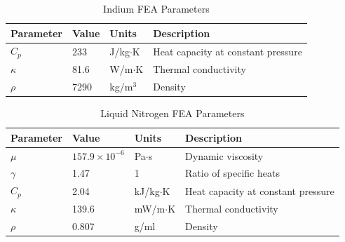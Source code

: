 \documentclass[preprint]{iucr}              %
\begin{document}
\begin{table}
\caption{Indium FEA Parameters}
\begin{tabular}{@{}llll@{}}
Parameter    & Value                  & Units                      & Description                        \\
\hline
$C_p$        & 233                    & J/kg$\cdot$K               & Heat capacity at constant pressure \\
$\kappa$     & 81.6                   & W/m$\cdot$K                & Thermal conductivity               \\
$\rho$       & 7290                   & kg/m$^3$                   & Density                            \\
\end{tabular}
\label{indiumFEA}
\end{table}


\begin{table}
\caption{Liquid Nitrogen FEA Parameters}
\begin{tabular}{@{}llll@{}}
Parameter    & Value                  & Units                       & Description                        \\
\hline
$\mu$        & $157.9\times 10^{-6}$  & Pa$\cdot$s                  & Dynamic viscosity                  \\ 
$\gamma$     & 1.47                   & 1				            & Ratio of specific heats            \\
$C_p$        & 2.04                   & kJ/kg$\cdot$K               & Heat capacity at constant pressure \\
$\kappa$     & 139.6                  & mW/m$\cdot$K                & Thermal conductivity               \\
$\rho$       & 0.807                  & g/ml                        & Density                            \\
\end{tabular}
\label{nitrogenFEA}
\end{table}
\end{document}

